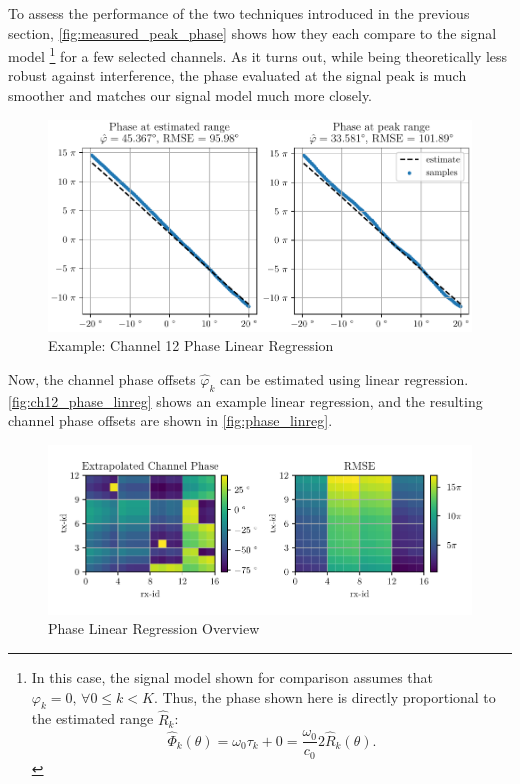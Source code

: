 To assess the performance of the two techniques introduced in the previous section,
\autoref{fig:measured_peak_phase} shows how they each compare to the signal model
\footnote{
    In this case, the signal model shown for comparison assumes that $\varphi_k = 0,\, \forall 0 \leq k<K$.
    Thus, the phase shown here is directly proportional to the estimated range $\hat R_k$:
    $$
        \hat\Phi_k(\theta) = \omega_0 \tau_k + 0 =  \frac{\omega_0}{c_0}2\hat R_k(\theta).
    $$
} for a few selected channels.
As it turns out, while being theoretically less robust against interference,
the phase evaluated at the signal peak is much smoother and matches our signal model much more closely. \\
\begin{figure}
    \centering
    \includegraphics[width=\textwidth]{../figures/ch12_phase_linreg.pdf}
    \caption{Example: Channel 12 Phase Linear Regression}
    \label{fig:ch12_phase_linreg}
\end{figure}
Now, the channel phase offsets $\hat \varphi_k$ can be estimated using linear regression.
\autoref{fig:ch12_phase_linreg} shows an example linear regression,
and the resulting channel phase offsets are shown in \autoref{fig:phase_linreg}.
\begin{figure}
    \centering
    \includegraphics[width=\textwidth]{../figures/phase_linreg.pdf}
    \caption{Phase Linear Regression Overview}
    \label{fig:phase_linreg}
\end{figure}

